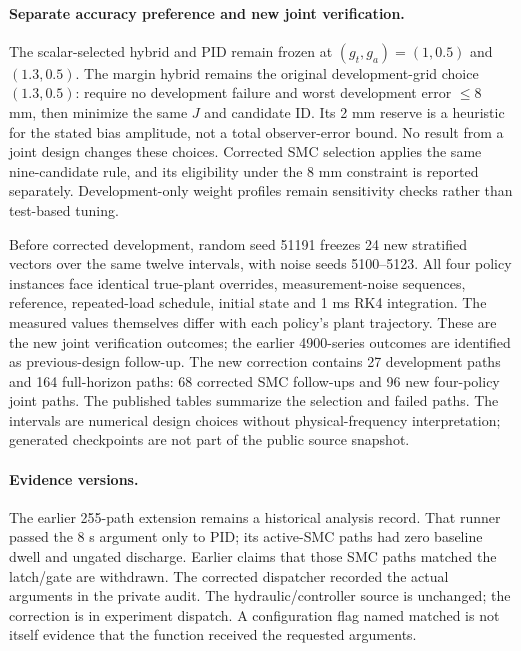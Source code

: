 \documentclass[11pt,a4paper]{article}
\begin{document}
\paragraph{Separate accuracy preference and new joint verification.}
The scalar-selected hybrid and PID remain frozen at $(g_t,g_a)=(1,0.5)$ and $(1.3,0.5)$. The margin hybrid remains the original development-grid choice $(1.3,0.5)$: require no development failure and worst development error $\le8$ mm, then minimize the same $J$ and candidate ID. Its 2 mm reserve is a heuristic for the stated bias amplitude, not a total observer-error bound. No result from a joint design changes these choices. Corrected SMC selection applies the same nine-candidate rule, and its eligibility under the 8 mm constraint is reported separately. Development-only weight profiles remain sensitivity checks rather than test-based tuning.

Before corrected development, random seed 51191 freezes 24 new stratified vectors over the same twelve intervals, with noise seeds 5100--5123. All four policy instances face identical true-plant overrides, measurement-noise sequences, reference, repeated-load schedule, initial state and 1 ms RK4 integration. The measured values themselves differ with each policy's plant trajectory. These are the new joint verification outcomes; the earlier 4900-series outcomes are identified as previous-design follow-up. The new correction contains 27 development paths and 164 full-horizon paths: 68 corrected SMC follow-ups and 96 new four-policy joint paths. The published tables summarize the selection and failed paths. The intervals are numerical design choices without physical-frequency interpretation; generated checkpoints are not part of the public source snapshot.


\paragraph{Evidence versions.} The earlier 255-path extension remains a historical analysis record. That runner passed the 8 s argument only to PID; its active-SMC paths had zero baseline dwell and ungated discharge. Earlier claims that those SMC paths matched the latch/gate are withdrawn. The corrected dispatcher recorded the actual arguments in the private audit. The hydraulic/controller source is unchanged; the correction is in experiment dispatch. A configuration flag named matched is not itself evidence that the function received the requested arguments.
\end{document}
